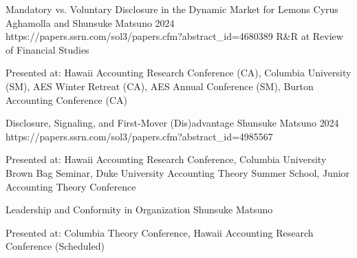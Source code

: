 


\paperentry
	{Mandatory vs. Voluntary Disclosure in the Dynamic Market for Lemons}   %
	{Cyrus Aghamolla and Shunsuke Matsuno}   %
	{2024}   %
	{https://papers.ssrn.com/sol3/papers.cfm?abstract_id=4680389}  %
	{}   %
	{R\&R at Review of Financial Studies}   %
	{
	\begin{cvitems}  %
		\item {Presented at: Hawaii Accounting Research Conference (CA), Columbia University (SM), AES Winter Retreat (CA), AES Annual Conference (SM), Burton Accounting Conference (CA)}			
	\end{cvitems}
	}

\paperentry
	{Disclosure, Signaling, and First-Mover (Dis)advantage}   %
	{Shunsuke Matsuno}   %
	{2024}
	{https://papers.ssrn.com/sol3/papers.cfm?abstract_id=4985567}  %
	{}   %
	{}   %
	{
	\begin{cvitems}  %
		\item {Presented at: Hawaii Accounting Research Conference, Columbia University Brown Bag Seminar, Duke University Accounting Theory Summer School, Junior Accounting Theory Conference}
	\end{cvitems}
	}

\paperentry
	{Leadership and Conformity in Organization}
	{Shunsuke Matsuno}
	{}
	{}
	{}
	{}
	{
	\begin{cvitems} %
		\item {Presented at: Columbia Theory Conference, Hawaii Accounting Research Conference (Scheduled)}
	\end{cvitems}
	}

\vspace{.3cm}




